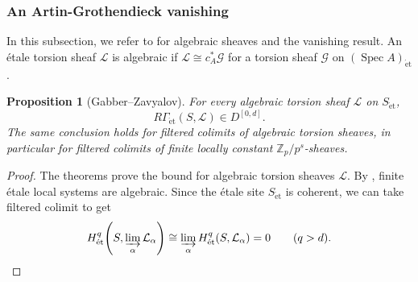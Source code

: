 \documentclass[11pt]{article}
\newtheorem{proposition}[theorem]{Proposition}
\theoremstyle{definition}
\newcommand{\Zp}{\mathbb Z_p}
\newcommand{\cL}{\mathcal L}
\newcommand{\et}{\mathrm{\acute et}}
\begin{document}
\subsubsection{An Artin-Grothendieck vanishing}
In this subsection, we refer to \cite{GabberZavyalov} for algebraic sheaves and the vanishing result. 
An \'etale torsion sheaf \(\mathcal L\) is algebraic if
\(\mathcal L\cong c_A^*\mathcal G\) for a torsion sheaf
\(\mathcal G\) on \((\operatorname{Spec}A)_{\et}\).

\begin{proposition}[Gabber--Zavyalov]
\label{prop:algebraic-Artin}
For every algebraic torsion sheaf \(\mathcal L\) on \(S_{\et}\),
\begin{equation}\label{eq:general-algebraic-Artin}
 R\Gamma_{\et}(S,\mathcal L)\in D^{[0,d]}.
\end{equation}
The same conclusion holds for filtered colimits of algebraic
torsion sheaves, in particular for filtered colimits of finite
locally constant \(\Zp/p^s\)-sheaves.  %
\end{proposition}
\begin{proof}
The theorems 
\cite[Theorems~3.1 and~4.4]{GabberZavyalov} prove the bound for algebraic torsion sheaves $\cL$. %
By \cite[Lemma~4.3(1)]{GabberZavyalov}, finite \'etale local systems are algebraic.  Since the \'etale site \(S_{\et}\) is coherent, we can take filtered colimit to get
\[
 H^q_{\et}\!\left(S,\varinjlim_\alpha\mathcal L_\alpha\right)
 \cong\varinjlim_\alpha H^q_{\et}(S,\mathcal L_\alpha)=0
 \qquad(q>d).
\]
\end{proof}
\end{document}
